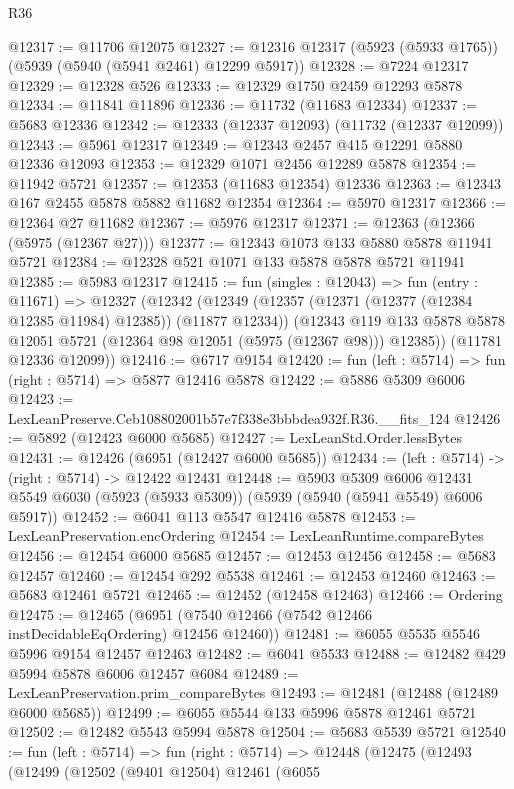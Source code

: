 \begin{lexlean}{R36}
\begin{coremodule}
@12317 := @11706 @12075
@12327 := @12316 @12317 (@5923 (@5933 @1765)) (@5939 (@5940 (@5941 @2461) @12299 @5917))
@12328 := @7224 @12317
@12329 := @12328 @526
@12333 := @12329 @1750 @2459 @12293 @5878
@12334 := @11841 @11896
@12336 := @11732 (@11683 @12334)
@12337 := @5683 @12336
@12342 := @12333 (@12337 @12093) (@11732 (@12337 @12099))
@12343 := @5961 @12317
@12349 := @12343 @2457 @415 @12291 @5880 @12336 @12093
@12353 := @12329 @1071 @2456 @12289 @5878
@12354 := @11942 @5721
@12357 := @12353 (@11683 @12354) @12336
@12363 := @12343 @167 @2455 @5878 @5882 @11682 @12354
@12364 := @5970 @12317
@12366 := @12364 @27 @11682
@12367 := @5976 @12317
@12371 := @12363 (@12366 (@5975 (@12367 @27)))
@12377 := @12343 @1073 @133 @5880 @5878 @11941 @5721
@12384 := @12328 @521 @1071 @133 @5878 @5878 @5721 @11941
@12385 := @5983 @12317
@12415 := fun (singles : @12043) =>
  fun (entry : @11671) =>
  @12327
    (@12342
      (@12349
        (@12357 (@12371 (@12377 (@12384 @12385 @11984) @12385)) (@11877 @12334))
        (@12343 @119 @133 @5878 @5878 @12051 @5721 (@12364 @98 @12051 (@5975 (@12367 @98))) @12385))
      (@11781 @12336 @12099))
@12416 := @6717 @9154
@12420 := fun (left : @5714) => fun (right : @5714) => @5877 @12416 @5878
@12422 := @5886 @5309 @6006
@12423 := LexLeanPreserve.Ceb108802001b57e7f338e3bbbdea932f.R36.__fits_124
@12426 := @5892 (@12423 @6000 @5685)
@12427 := LexLeanStd.Order.lessBytes
@12431 := @12426 (@6951 (@12427 @6000 @5685))
@12434 := (left : @5714) -> (right : @5714) -> @12422 @12431
@12448 := @5903
    @5309
    @6006
    @12431
    @5549
    @6030
    (@5923 (@5933 @5309))
    (@5939 (@5940 (@5941 @5549) @6006 @5917))
@12452 := @6041 @113 @5547 @12416 @5878
@12453 := LexLeanPreservation.encOrdering
@12454 := LexLeanRuntime.compareBytes
@12456 := @12454 @6000 @5685
@12457 := @12453 @12456
@12458 := @5683 @12457
@12460 := @12454 @292 @5538
@12461 := @12453 @12460
@12463 := @5683 @12461 @5721
@12465 := @12452 (@12458 @12463)
@12466 := Ordering
@12475 := @12465 (@6951 (@7540 @12466 (@7542 @12466 instDecidableEqOrdering) @12456 @12460))
@12481 := @6055 @5535 @5546 @5996 @9154 @12457 @12463
@12482 := @6041 @5533
@12488 := @12482 @429 @5994 @5878 @6006 @12457 @6084
@12489 := LexLeanPreservation.prim_compareBytes
@12493 := @12481 (@12488 (@12489 @6000 @5685))
@12499 := @6055 @5544 @133 @5996 @5878 @12461 @5721
@12502 := @12482 @5543 @5994 @5878
@12504 := @5683 @5539 @5721
@12540 := fun (left : @5714) =>
  fun (right : @5714) =>
  @12448
    (@12475
      (@12493
        (@12499
          (@12502
            (@9401 @12504)
            @12461
            (@6055

\end{coremodule}
\end{lexlean}
